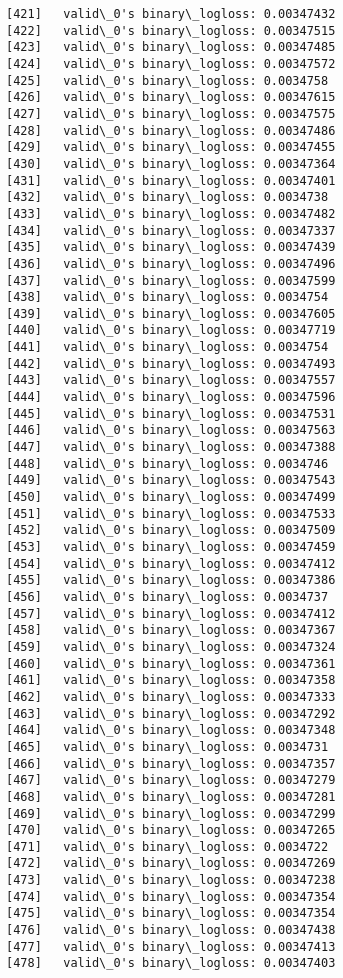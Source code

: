 \documentclass[11pt]{article}
\begin{document}
\begin{Verbatim}[commandchars=\\\{\}]
[421]	valid\_0's binary\_logloss: 0.00347432
[422]	valid\_0's binary\_logloss: 0.00347515
[423]	valid\_0's binary\_logloss: 0.00347485
[424]	valid\_0's binary\_logloss: 0.00347572
[425]	valid\_0's binary\_logloss: 0.0034758
[426]	valid\_0's binary\_logloss: 0.00347615
[427]	valid\_0's binary\_logloss: 0.00347575
[428]	valid\_0's binary\_logloss: 0.00347486
[429]	valid\_0's binary\_logloss: 0.00347455
[430]	valid\_0's binary\_logloss: 0.00347364
[431]	valid\_0's binary\_logloss: 0.00347401
[432]	valid\_0's binary\_logloss: 0.0034738
[433]	valid\_0's binary\_logloss: 0.00347482
[434]	valid\_0's binary\_logloss: 0.00347337
[435]	valid\_0's binary\_logloss: 0.00347439
[436]	valid\_0's binary\_logloss: 0.00347496
[437]	valid\_0's binary\_logloss: 0.00347599
[438]	valid\_0's binary\_logloss: 0.0034754
[439]	valid\_0's binary\_logloss: 0.00347605
[440]	valid\_0's binary\_logloss: 0.00347719
[441]	valid\_0's binary\_logloss: 0.0034754
[442]	valid\_0's binary\_logloss: 0.00347493
[443]	valid\_0's binary\_logloss: 0.00347557
[444]	valid\_0's binary\_logloss: 0.00347596
[445]	valid\_0's binary\_logloss: 0.00347531
[446]	valid\_0's binary\_logloss: 0.00347563
[447]	valid\_0's binary\_logloss: 0.00347388
[448]	valid\_0's binary\_logloss: 0.0034746
[449]	valid\_0's binary\_logloss: 0.00347543
[450]	valid\_0's binary\_logloss: 0.00347499
[451]	valid\_0's binary\_logloss: 0.00347533
[452]	valid\_0's binary\_logloss: 0.00347509
[453]	valid\_0's binary\_logloss: 0.00347459
[454]	valid\_0's binary\_logloss: 0.00347412
[455]	valid\_0's binary\_logloss: 0.00347386
[456]	valid\_0's binary\_logloss: 0.0034737
[457]	valid\_0's binary\_logloss: 0.00347412
[458]	valid\_0's binary\_logloss: 0.00347367
[459]	valid\_0's binary\_logloss: 0.00347324
[460]	valid\_0's binary\_logloss: 0.00347361
[461]	valid\_0's binary\_logloss: 0.00347358
[462]	valid\_0's binary\_logloss: 0.00347333
[463]	valid\_0's binary\_logloss: 0.00347292
[464]	valid\_0's binary\_logloss: 0.00347348
[465]	valid\_0's binary\_logloss: 0.0034731
[466]	valid\_0's binary\_logloss: 0.00347357
[467]	valid\_0's binary\_logloss: 0.00347279
[468]	valid\_0's binary\_logloss: 0.00347281
[469]	valid\_0's binary\_logloss: 0.00347299
[470]	valid\_0's binary\_logloss: 0.00347265
[471]	valid\_0's binary\_logloss: 0.0034722
[472]	valid\_0's binary\_logloss: 0.00347269
[473]	valid\_0's binary\_logloss: 0.00347238
[474]	valid\_0's binary\_logloss: 0.00347354
[475]	valid\_0's binary\_logloss: 0.00347354
[476]	valid\_0's binary\_logloss: 0.00347438
[477]	valid\_0's binary\_logloss: 0.00347413
[478]	valid\_0's binary\_logloss: 0.00347403

\end{Verbatim}
\end{document}
